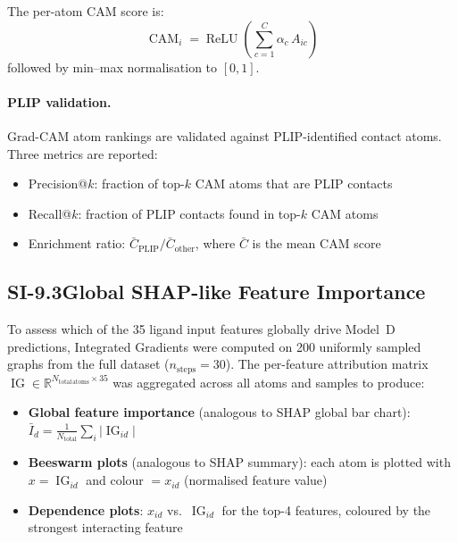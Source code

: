 \documentclass[11pt]{article}
\begin{document}
The per-atom CAM score is:
\begin{equation}
  \operatorname{CAM}_i = \operatorname{ReLU}\!\left(
    \sum_{c=1}^{C} \alpha_c\, A_{ic}
  \right)
  \label{eq:gradcam_cam}
\end{equation}
followed by min--max normalisation to $[0, 1]$.

\paragraph{PLIP validation.}
Grad-CAM atom rankings are validated against PLIP-identified contact atoms.
Three metrics are reported:
\begin{itemize}[leftmargin=1.5em]
  \item Precision@$k$: fraction of top-$k$ CAM atoms that are PLIP contacts
  \item Recall@$k$: fraction of PLIP contacts found in top-$k$ CAM atoms
  \item Enrichment ratio:
    $\bar{C}_{\mathrm{PLIP}} / \bar{C}_{\mathrm{other}}$,
    where $\bar{C}$ is the mean CAM score
\end{itemize}

\subsection*{SI-9.3\quad Global SHAP-like Feature Importance}

To assess which of the 35 ligand input features globally drive
Model~D predictions, Integrated Gradients were computed on 200 uniformly
sampled graphs from the full dataset ($n_{\mathrm{steps}} = 30$).
The per-feature attribution matrix
$\operatorname{IG} \in \mathbb{R}^{N_{\mathrm{total\,atoms}} \times 35}$
was aggregated across all atoms and samples to produce:

\begin{itemize}[leftmargin=1.5em]
  \item \textbf{Global feature importance}
    (analogous to SHAP global bar chart):
    $\bar{I}_d = \frac{1}{N_{\mathrm{total}}}
    \sum_{i} |\operatorname{IG}_{id}|$
  \item \textbf{Beeswarm plots}
    (analogous to SHAP summary):
    each atom is plotted with $x = \operatorname{IG}_{id}$
    and colour $= x_{id}$ (normalised feature value)
  \item \textbf{Dependence plots}:
    $x_{id}$ vs.\ $\operatorname{IG}_{id}$ for the top-4 features,
    coloured by the strongest interacting feature
\end{itemize}
\end{document}
